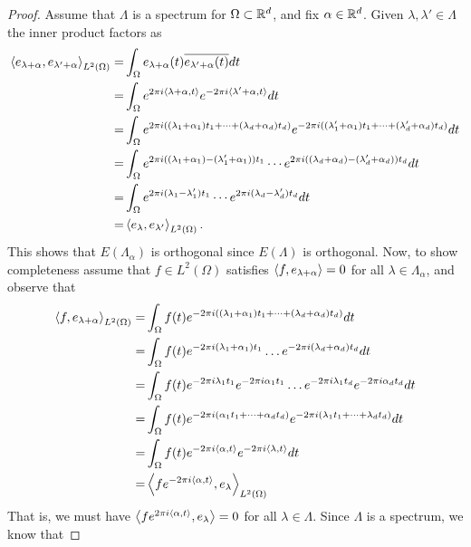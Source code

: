 \documentclass[../thesis.tex]{subfiles}
\begin{document}
\begin{proof}
    Assume that $\Lambda$ is a spectrum for $\Omega \subset \mathbb{R}^d$, and fix $\alpha\in \mathbb{R}^d$. Given $\lambda,\lambda' \in \Lambda$ the inner product factors as
    \begin{align*}
        \left \langle e_{\lambda+\alpha},e_{\lambda'+\alpha} \right \rangle_{L^2(\Omega)} =& \int_{\Omega} e_{\lambda+\alpha}(t)\overline{e_{\lambda'+\alpha}(t)} dt\\
        =& \int_{\Omega} e^{2\pi i \langle\lambda+\alpha,t\rangle} e^{-2 \pi i \langle\lambda'+\alpha,t\rangle} dt\\
        =& \int_{\Omega} e^{2\pi i  ((\lambda_1+\alpha_1)t_1 + \dots +(\lambda_d+\alpha_d) t_d)} e^{-2\pi i  ((\lambda_1'+\alpha_1) t_1 + \dots +(\lambda_d'+\alpha_d) t_d)} dt\\
        =& \int_{\Omega} e^{2\pi i  ((\lambda_1+\alpha_1) -(\lambda_1'+\alpha_1))t_1} \cdots e^{2\pi i  ((\lambda_d+\alpha_d) -(\lambda_d'+\alpha_d))t_d} dt\\
        =& \int_{\Omega} e^{2\pi i  (\lambda_1 -\lambda_1')t_1} \cdots e^{2\pi i  (\lambda_d -\lambda_d')t_d} dt\\
        =& \left \langle e_{\lambda},e_{\lambda'} \right \rangle_{L^2(\Omega)}.
    \end{align*}
    This shows that $E(\Lambda_\alpha)$ is orthogonal since $E(\Lambda)$ is orthogonal. Now, to show completeness assume that $f\in L^2(\Omega)$ satisfies $\left \langle f,e_{\lambda + \alpha} \right \rangle = 0$ for all $\lambda\in \Lambda_\alpha$, and observe that
    \begin{align*}
        \left \langle f,e_{\lambda+\alpha} \right \rangle_{L^2(\Omega)} =& \int_{\Omega} f(t) e^{-2\pi i  ((\lambda_1+\alpha_1) t_1 + \dots +(\lambda_d+\alpha_d) t_d)} dt\\
        =& \int_{\Omega} f(t) e^{-2\pi i  (\lambda_1+\alpha_1)t_1} \dots e^{-2\pi i  (\lambda_d+\alpha_d)t_d} dt\\
        =& \int_{\Omega} f(t) e^{-2\pi i  \lambda_1 t_1}e^{-2\pi i  \alpha_1 t_1} \dots e^{-2\pi i  \lambda_1 t_d}e^{-2\pi i  \alpha_d t_d} dt\\
        =& \int_{\Omega} f(t) e^{-2\pi i  (\alpha_1t_1 + \dots + \alpha_dt_d) }  e^{-2\pi i  (\lambda_1t_1 + \dots + \lambda_d t_d)}dt\\
        =& \int_{\Omega} f(t) e^{-2\pi i \langle\alpha, t\rangle }  e^{-2\pi i  \langle\lambda, t\rangle}dt\\
        =& \left \langle f e^{-2\pi i  \langle\alpha, t\rangle },e_{\lambda} \right \rangle_{L^2(\Omega)}
    \end{align*}
    That is, we must have $\left \langle f e^{2\pi i  \langle\alpha, t\rangle },e_{\lambda} \right \rangle = 0$ for all $\lambda \in \Lambda$. Since $\Lambda$ is a spectrum, we know that 

\end{proof}
\end{document}
